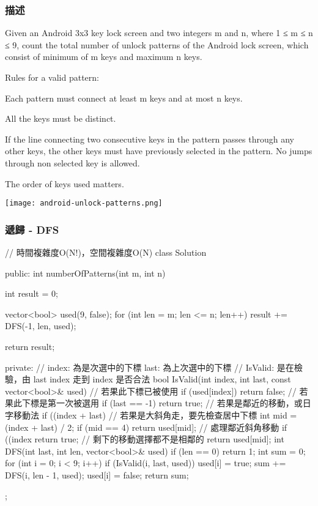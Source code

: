 \subsubsection{描述}
Given an Android 3x3 key lock screen and two integers m and n, where 1 ≤ m ≤ n ≤ 9, count the total number of unlock patterns of the Android lock screen, which consist of minimum of m keys and maximum n keys.

Rules for a valid pattern:
\begindot
\item Each pattern must connect at least m keys and at most n keys.
\item All the keys must be distinct.
\item If the line connecting two consecutive keys in the pattern passes through any other keys, the other keys must have previously selected in the pattern. No jumps through non selected key is allowed.
\item The order of keys used matters.
\myenddot

\begin{center}
\texttt{[image: android-unlock-patterns.png]}\\
\label{fig:android-unlock-patterns}
\end{center}

\subsubsection{遞歸 - DFS}
\begin{Code}
// 時間複雜度O(N!)，空間複雜度O(N)
class Solution {
public:
    int numberOfPatterns(int m, int n) {
        int result = 0;

        vector<bool> used(9, false);
        for (int len = m; len <= n; len++)
            result += DFS(-1, len, used);

        return result;
    }
private:
    // index: 為是次選中的下標 last: 為上次選中的下標
    // IsValid: 是在檢驗，由 last index 走到 index 是否合法
    bool IsValid(int index, int last, const vector<bool>& used)
    {
        // 若果此下標已被使用
        if (used[index]) return false;
        // 若果此下標是第一次被選用
        if (last == -1) return true;
        // 若果是鄰近的移動，或日字移動法
        if ((index + last) %
        // 若果是大斜角走，要先檢查居中下標
        int mid = (index + last) / 2;
        if (mid == 4) return used[mid];
        // 處理鄰近斜角移動
        if ((index %
            return true;
        // 剩下的移動選擇都不是相鄰的
        return used[mid];
    }
    int DFS(int last, int len, vector<bool>& used)
    {
        if (len == 0)
            return 1;
        int sum = 0;
        for (int i = 0; i < 9; i++)
        {
            if (IsValid(i, last, used))
            {
                used[i] = true;
                sum += DFS(i, len - 1, used);
                used[i] = false;
            }
        }
        return sum;
    }
};
\end{Code}

